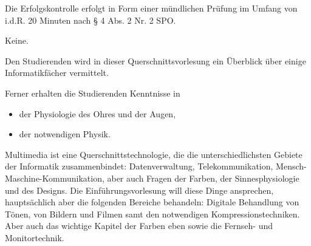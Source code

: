 \begin{course}

\setdoclanguagegerman
{}



\coursehead


\label{cour_8437.dp_997}


\begin{styleenv}
\begin{assessment}
Die Erfolgskontrolle erfolgt in Form einer mündlichen Prüfung im Umfang von i.d.R. 20 Minuten nach § 4 Abs. 2 Nr. 2 SPO.


\end{assessment}

\begin{conditions}Keine.\end{conditions}


\end{styleenv}

\begin{learningoutcomes}
Den Studierenden wird in dieser Querschnittsvorlesung ein Überblick über einige Informatikfächer vermittelt.

 

Ferner erhalten die Studierenden Kenntnisse in

 \begin{itemize}\item  der Physiologie des Ohres und der Augen,   \item  der notwendigen Physik.  \end{itemize}
\end{learningoutcomes}

\begin{content}
Multimedia ist eine Querschnittstechnologie, die die unterschiedlichsten Gebiete der Informatik zusammenbindet: Datenverwaltung, Telekommunikation, Mensch-Maschine-Kommunikation, aber auch Fragen der Farben, der Sinnesphysiologie und des Designs.\newline
\newline
 Die Einführungsvorlesung will diese Dinge ansprechen, hauptsächlich aber die folgenden Bereiche behandeln:\newline
 Digitale Behandlung von Tönen, von Bildern und Filmen samt den notwendigen Kompressionstechniken. Aber auch das wichtige Kapitel der Farben eben sowie die Fernseh- und Monitortechnik.



\end{content}
\end{course}
